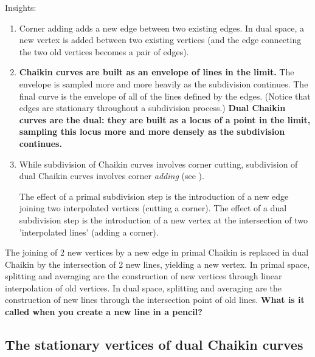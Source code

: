 \documentclass[12pt]{article}
\begin{document}
Insights: 
\begin{enumerate}
\item Corner adding adds a new edge between two existing edges.
	In dual space, a new vertex is added between two existing vertices
	(and the edge connecting the two old vertices becomes
	a pair of edges).
\item {\bf Chaikin curves are built as an envelope of lines in the limit.}
	The envelope is sampled more and more heavily as the subdivision
	continues.  The final curve is the envelope of all of the lines
	defined by the edges.  (Notice that edges are stationary throughout
	a subdivision process.)
	{\bf Dual Chaikin curves are the dual: they are built as a locus of a point
	in the limit, sampling this locus more and more densely as the subdivision
	continues.}
\item While subdivision of Chaikin curves involves corner cutting, 
	subdivision of dual Chaikin curves involves corner {\em adding}
	(see \cite[p. 212, Fig. 1]{dyn92}).
	
      The effect of a primal subdivision step is the introduction of a new edge
	joining two interpolated vertices (cutting a corner).
	The effect of a dual subdivision step is the introduction of a new vertex
	at the intersection of two 'interpolated lines' (adding a corner).
\end{enumerate}

The joining of 2 new vertices by a new edge in primal Chaikin
is replaced in dual Chaikin by the intersection of 2 new lines, 
yielding a new vertex.
In primal space, splitting and averaging are the construction of new vertices
through linear interpolation of old vertices.
In dual space, splitting and averaging are the construction of new lines
through the intersection point of old lines.  
{\bf What is it called when you create a new line in a pencil?}


\subsection{The stationary vertices of dual Chaikin curves}
\end{document}
